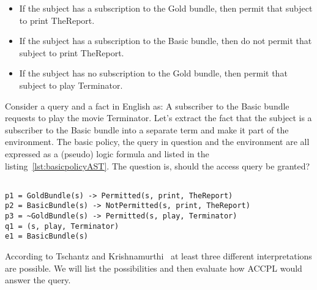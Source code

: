 \begin{itemize}
\item If the subject has a subscription to the Gold bundle, then permit that subject to print TheReport.

\item If the subject has a subscription to the Basic bundle, then do not permit that subject to print TheReport.

\item If the subject has no subscription to the Gold bundle, then permit that subject to play Terminator.
\end{itemize}

Consider a query and a fact in English as: A subscriber to the Basic bundle requests to play the movie Terminator. Let's extract the fact that the subject is a subscriber to the Basic bundle into a separate term and make it part of the environment. The basic policy, the query in question and the environment are all expressed as a (pseudo) logic formula and listed in the listing~\ref{lst:basicpolicyAST}. The question is, should the access query be granted?

\lstset{mathescape, language=AST}  
\begin{lstlisting}[frame=single, caption={Basic Policy},label={lst:basicpolicyAST}]

p1 = GoldBundle(s) -> Permitted(s, print, TheReport) 
p2 = BasicBundle(s) -> NotPermitted(s, print, TheReport) 
p3 = ~GoldBundle(s) -> Permitted(s, play, Terminator)
q1 = (s, play, Terminator) 
e1 = BasicBundle(s)
\end{lstlisting}


According to Tschantz and Krishnamurthi~\cite{Tschantz} at least three different interpretations are possible. We will list the possibilities and then evaluate how \ac{ACCPL} would answer the query.

